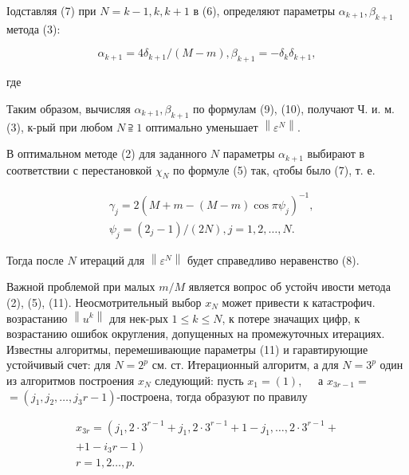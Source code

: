 \documentclass[10pt]{article}
\begin{document}
Іодставляя (7) при $N=k-1, k, k+1$ в (6), определяют параметры $\alpha_{k+1}, \beta_{k+1}$ метода (3):



\[

\alpha_{k+1}=4 \delta_{k+1} /(M-m), \beta_{k+1}=-\delta_{k} \delta_{k+1},

\]



где



Таким образом, вычисляя $\alpha_{k+1}, \beta_{k+1}$ по формулам (9), (10), получают Ч. и. м. (3), к-рый при любом $N \supseteqq 1$ оптимально уменьшает $\left\|\varepsilon^{N}\right\|$.



В оптимальном методе (2) для заданного $N$ параметры $\alpha_{k+1}$ выбирают в соответствии с перестановкой $\chi_{N}$ по формуле (5) так, qтобы было (7), т. е.



\[

\begin{aligned}

& \gamma_{j}=2\left(M+m-(M-m) \cos \pi \psi_{j}\right)^{-1}, \\

& \psi_{j}=\left(2_{j}-1\right) /(2 N), j=1,2, \ldots, N .

\end{aligned}

\]



Тогда после $N$ итераций для $\left\|\varepsilon^{N}\right\|$ будет справедливо неравенство (8).



Важной проблемой при малых $m / M$ является вопрос об устойч ивости метода (2), (5), (11). Неосмотрительный выбор $x_{N}$ может привести к катастрофич. возрастанию $\left\|u^{k}\right\|$ для нек-рых $1 \leqslant k \leqslant N$, к потере значащих цифр, к возрастанию ошибок округления, допущенных на промежуточных итерациях. Известны алгоритмы, перемешивающие параметры (11) и гаравтирующие устойчивый счет: для $N=2^{p}$ см. ст. Итерационный алгоритм, а для $N=3^{p}$ один из алгоритмов построения $x_{N}$ следующий: пусть $x_{1}=(1), \quad$ а $x_{3 r-1}=$ $=\left(j_{1}, j_{2}, \ldots, j_{3} r-1\right)$-построена, тогда образуют по правилу



\[

\begin{gathered}

x_{3 r}=\left(j_{1}, 2 \cdot 3^{r-1}+j_{1}, 2 \cdot 3^{r-1}+1-j_{1}, \ldots, 2 \cdot 3^{r-1}+\right. \\

\left.+1-i_{3} r-1\right) \\

r=1,2 \ldots, p .

\end{gathered}

\]
\end{document}
